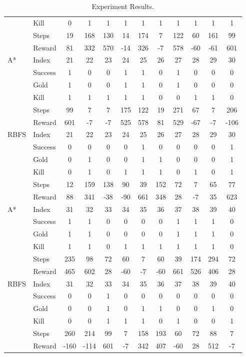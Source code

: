\begin{table}[!h]
{\begin{tabular}{|l|l|c|c|c|c|c|c|c|c|c|c|}
		 & Kill & 0 & 1 & 1 & 1 & 1 & 1 & 1 & 1 & 1 & 1 \\ \cline{2-12}
		 & Steps & 19 & 168 & 130 & 14 & 174 & 7 & 122 & 60 & 161 & 99 \\ \cline{2-12}
		 & Reward & 81 & 332 & 570 & -14 & 326 & -7 & 578 & -60 & -61 & 601 \\ \cline{2-12}
		\hline
		A* & Index & 21 & 22 & 23 & 24 & 25 & 26 & 27 & 28 & 29 & 30 \\ \cline{2-12}
		 & Success & 1 & 0 & 0 & 1 & 1 & 0 & 1 & 0 & 0 & 0 \\ \cline{2-12}
		 & Gold & 1 & 0 & 0 & 1 & 1 & 0 & 1 & 0 & 0 & 0 \\ \cline{2-12}
		 & Kill & 1 & 1 & 1 & 1 & 1 & 0 & 0 & 1 & 1 & 0 \\ \cline{2-12}
		 & Steps & 99 & 7 & 7 & 175 & 122 & 19 & 271 & 67 & 7 & 206 \\ \cline{2-12}
		 & Reward & 601 & -7 & -7 & 525 & 578 & 81 & 529 & -67 & -7 & -106 \\ \cline{2-12}
		\hline
		RBFS & Index & 21 & 22 & 23 & 24 & 25 & 26 & 27 & 28 & 29 & 30 \\ \cline{2-12}
		 & Success & 0 & 0 & 0 & 0 & 1 & 0 & 0 & 0 & 0 & 1 \\ \cline{2-12}
		 & Gold & 0 & 1 & 0 & 0 & 1 & 1 & 0 & 0 & 0 & 1 \\ \cline{2-12}
		 & Kill & 0 & 1 & 0 & 1 & 1 & 1 & 0 & 1 & 0 & 1 \\ \cline{2-12}
		 & Steps & 12 & 159 & 138 & 90 & 39 & 152 & 72 & 7 & 65 & 77 \\ \cline{2-12}
		 & Reward & 88 & 341 & -38 & -90 & 661 & 348 & 28 & -7 & 35 & 623 \\ \cline{2-12}
		\hline
		A* & Index & 31 & 32 & 33 & 34 & 35 & 36 & 37 & 38 & 39 & 40 \\ \cline{2-12}
		 & Success & 1 & 1 & 0 & 0 & 0 & 0 & 1 & 1 & 1 & 0 \\ \cline{2-12}
		 & Gold & 1 & 1 & 0 & 0 & 0 & 0 & 1 & 1 & 1 & 0 \\ \cline{2-12}
		 & Kill & 1 & 1 & 0 & 1 & 1 & 1 & 1 & 1 & 1 & 0 \\ \cline{2-12}
		 & Steps & 235 & 98 & 72 & 60 & 7 & 60 & 39 & 174 & 294 & 72 \\ \cline{2-12}
		 & Reward & 465 & 602 & 28 & -60 & -7 & -60 & 661 & 526 & 406 & 28 \\ \cline{2-12}
		\hline
		RBFS & Index & 31 & 32 & 33 & 34 & 35 & 36 & 37 & 38 & 39 & 40 \\ \cline{2-12}
		 & Success & 0 & 0 & 1 & 0 & 0 & 0 & 0 & 0 & 0 & 0 \\ \cline{2-12}
		 & Gold & 0 & 0 & 1 & 0 & 1 & 1 & 0 & 0 & 1 & 0 \\ \cline{2-12}
		 & Kill & 0 & 0 & 1 & 1 & 1 & 0 & 1 & 0 & 0 & 1 \\ \cline{2-12}
		 & Steps & 260 & 214 & 99 & 7 & 158 & 193 & 60 & 72 & 88 & 7 \\ \cline{2-12}
		 & Reward & -160 & -114 & 601 & -7 & 342 & 407 & -60 & 28 & 512 & -7 \\ \cline{2-12}
		\hline
	    \end{tabular}
    }
    \caption{Experiment Results.}\label{tab:results}
\end{table}
